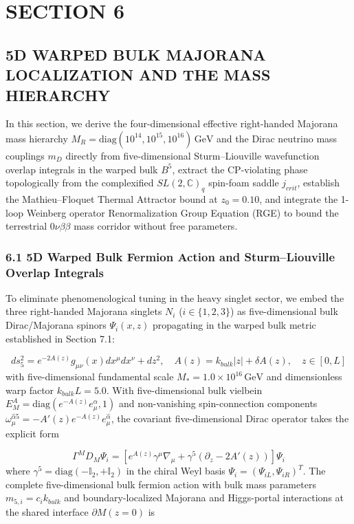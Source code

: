 \documentclass[aps,prd,onecolumn,superscriptaddress,nofootinbib,longbibliography,10pt]{revtex4-2}
\begin{document}
{{\section*{SECTION 6}


\subsection*{5D WARPED BULK MAJORANA LOCALIZATION AND THE MASS HIERARCHY}

In this section, we derive the four-dimensional effective right-handed Majorana mass hierarchy \(M_R = \mathrm{diag}(10^{14}, 10^{15}, 10^{16})\,\mathrm{GeV}\) and the Dirac neutrino mass couplings \(m_D\) directly from five-dimensional Sturm--Liouville wavefunction overlap integrals in the warped bulk \(B^5\), extract the CP-violating phase topologically from the complexified \(SL(2,\mathbb{C})_q\) spin-foam saddle \(j_{crit}\), establish the Mathieu--Floquet Thermal Attractor bound at \(z_0 = 0.10\), and integrate the 1-loop Weinberg operator Renormalization Group Equation (RGE) to bound the terrestrial \(0\nu\beta\beta\) mass corridor without free parameters.




\subsubsection*{6.1 5D Warped Bulk Fermion Action and Sturm--Liouville Overlap Integrals}

To eliminate phenomenological tuning in the heavy singlet sector, we embed the three right-handed Majorana singlets \(N_i\) (\(i \in \{1,2,3\}\)) as five-dimensional bulk Dirac/Majorana spinors \(\Psi_i(x,z)\) propagating in the warped bulk metric established in Section 7.1:


\[ds_5^2 = e^{-2A(z)}g_{\mu\nu}(x)dx^\mu dx^\nu + dz^2, \quad A(z) = k_{bulk}\vert z\vert + \delta A(z), \quad z \in [0,L]\]
with five-dimensional fundamental scale \(M_* = 1.0 \times 10^{16}\,\mathrm{GeV}\) and dimensionless warp factor \(k_{bulk}L = 5.0\). With five-dimensional bulk vielbein \(E_M^A = \mathrm{diag}(e^{-A(z)}e_\mu^\alpha, 1)\) and non-vanishing spin-connection components \(\omega_\mu^{\hat{\alpha}5} = -A'(z)e^{-A(z)}e_\mu^{\hat{\alpha}}\), the covariant five-dimensional Dirac operator takes the explicit form


\[\Gamma^M D_M \Psi_i = \left[ e^{A(z)}\gamma^\mu \nabla_\mu + \gamma^5 (\partial_z - 2A'(z)) \right] \Psi_i\]
where \(\gamma^5 = \mathrm{diag}(-\mathbb{I}_2, +\mathbb{I}_2)\) in the chiral Weyl basis \(\Psi_i = (\Psi_{iL}, \Psi_{iR})^T\). The complete five-dimensional bulk fermion action with bulk mass parameters \(m_{5,i} = c_i k_{bulk}\) and boundary-localized Majorana and Higgs-portal interactions at the shared interface \(\partial M (z=0)\) is


}}
\end{document}
